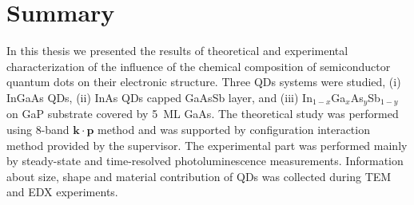 
\chapter{Summary}\label{chap:summary}

In this thesis we presented the results of theoretical and experimental characterization of the influence of the chemical composition of semiconductor quantum dots on their electronic structure. Three QDs systems were studied, (i) InGaAs QDs, (ii) InAs QDs capped GaAsSb layer, and (iii) In$_{1-x}$Ga$_x$As$_y$Sb$_{1-y}$ on GaP substrate covered by 5~ML GaAs. The theoretical study was performed using 8-band $\mathbf{k\cdot p}$ method and was supported by configuration interaction method provided by the supervisor. The experimental part was performed mainly by steady-state and time-resolved photoluminescence measurements. Information about size, shape and material contribution of QDs was collected during TEM and EDX experiments.
\newpage

\newpage 